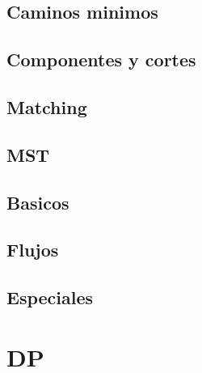 \documentclass[twocolumn]{article}
\begin{document}
	\subsection{Caminos minimos}
		
	
	
%	

	\subsection{Componentes y cortes}
	
	
	
	

	\subsection{Matching}
	
	

	\subsection{MST}
	
	

	\subsection{Basicos}
	
%	

	\subsection{Flujos}
	
	
	
	
	

	\subsection{Especiales}
	
	
	

	\section{DP}
%	
%	
%	
	
	
	
	
	
	
\end{document}
